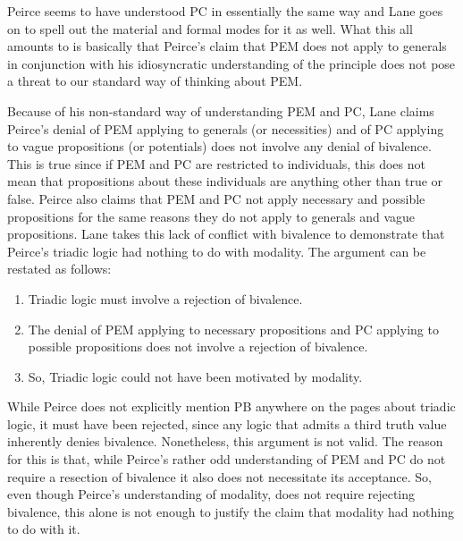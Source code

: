 Peirce seems to have understood PC in essentially the same way and Lane goes on to spell out the material and formal modes for it as well. What this all amounts to is basically that Peirce's claim that PEM does not apply to generals in conjunction with his idiosyncratic understanding of the principle does not pose a threat to our standard way of thinking about PEM.

Because of his non-standard way of understanding PEM and PC, Lane claims Peirce's denial of PEM applying to generals (or necessities) and of PC applying to vague propositions (or potentials) does not involve any denial of bivalence. This is true since if PEM and PC are restricted to individuals, this does not mean that propositions about these individuals are anything other than true or false. Peirce also claims that PEM and PC not apply necessary and possible propositions for the same reasons they do not apply to generals and vague propositions. Lane takes this lack of conflict with bivalence to demonstrate that Peirce's triadic logic had nothing to do with modality. The argument can be restated as follows: 
\begin{enumerate}
\item Triadic logic must involve a rejection of bivalence. 
\item The denial of PEM applying to necessary propositions and PC applying to possible propositions does not involve a rejection of bivalence.
\item So, Triadic logic could not have been motivated by modality.
\end{enumerate}
While Peirce does not explicitly mention PB anywhere on the pages about triadic logic, it must have been rejected, since any logic that admits a third truth value inherently denies bivalence. Nonetheless, this argument is not valid. The reason for this is that, while Peirce's rather odd understanding of PEM and PC do not require a resection of bivalence it also does not necessitate its acceptance. So, even though Peirce's understanding of modality, does not require rejecting bivalence, this alone is not enough to justify the claim that modality had nothing to do with it.

